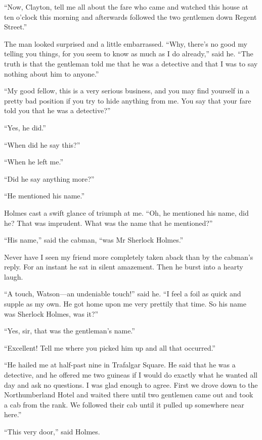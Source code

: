 \documentclass[paper=5.5in:8.5in,BCOR=7mm,twoside,DIV=calc,12pt,usegeometry,openany,chapterprefix,endperiod,headings=big]{scrbook} %
\begin{document}
\enquote{Now, Clayton, tell me all about the fare who came and watched this house at ten o'clock this morning and afterwards followed the two gentlemen down Regent Street.}

The man looked surprised and a little embarrassed. \enquote{Why, there's no good my telling you things, for you seem to know as much as I do already,} said he. \enquote{The truth is that the gentleman told me that he was a detective and that I was to say nothing about him to anyone.}

\enquote{My good fellow, this is a very serious business, and you may find yourself in a pretty bad position if you try to hide anything from me. You say that your fare told you that he was a detective?}

\enquote{Yes, he did.}

\enquote{When did he say this?}

\enquote{When he left me.}

\enquote{Did he say anything more?}

\enquote{He mentioned his name.}


Holmes cast a swift glance of triumph at me. \enquote{Oh, he mentioned his name, did he? That was imprudent. What was the name that he mentioned?}

\enquote{His name,} said the cabman, \enquote{was Mr Sherlock Holmes.}

Never have I seen my friend more completely taken aback than by the cabman's reply. For an instant he sat in silent amazement. Then he burst into a hearty laugh.

\enquote{A touch, Watson---an undeniable touch!} said he. \enquote{I feel a foil as quick and supple as my own. He got home upon me very prettily that time. So his name was Sherlock Holmes, was it?}

\enquote{Yes, sir, that was the gentleman's name.}

\enquote{Excellent! Tell me where you picked him up and all that occurred.}

\enquote{He hailed me at half-past nine in Trafalgar Square. He said that he was a detective, and he offered me two guineas if I would do exactly what he wanted all day and ask no questions. I was glad enough to agree. First we drove down to the Northumberland Hotel and waited there until two gentlemen came out and took a cab from the rank. We followed their cab until it pulled up somewhere near here.}

\enquote{This very door,} said Holmes.
\end{document}
